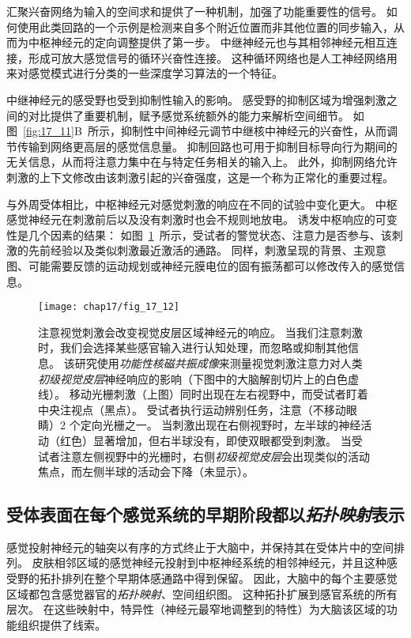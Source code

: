 汇聚兴奋网络为输入的空间求和提供了一种机制，加强了功能重要性的信号。
如何使用此类回路的一个示例是检测来自多个附近位置而非其他位置的同步输入，从而为中枢神经元的定向调整提供了第一步。 
中继神经元也与其相邻神经元相互连接，形成可放大感觉信号的循环兴奋性连接。 
这种循环网络也是人工神经网络用来对感觉模式进行分类的一些深度学习算法的一个特征。


中继神经元的感受野也受到抑制性输入的影响。 
感受野的抑制区域为增强刺激之间的对比提供了重要机制，赋予感觉系统额外的能力来解析空间细节。 
如图~\ref{fig:17_11}B~所示，抑制性中间神经元调节中继核中神经元的兴奋性，从而调节传输到网络更高层的感觉信息量。
抑制回路也可用于抑制目标导向行为期间的无关信息，从而将注意力集中在与特定任务相关的输入上。 
此外，抑制网络允许刺激的上下文修改由该刺激引起的兴奋强度，这是一个称为正常化的重要过程。


与外周受体相比，中枢神经元对感觉刺激的响应在不同的试验中变化更大。 
中枢感觉神经元在刺激前后以及没有刺激时也会不规则地放电。 
诱发中枢响应的可变性是几个因素的结果：
如图~\ref{fig:17_12}~所示，受试者的警觉状态、注意力是否参与、该刺激的先前经验以及类似刺激最近激活的通路。
同样，刺激呈现的背景、主观意图、可能需要反馈的运动规划或神经元膜电位的固有振荡都可以修改传入的感觉信息。


\begin{figure}[htbp]
	\centering
	\texttt{[image: chap17/fig\_17\_12]}
	\caption{注意视觉刺激会改变视觉皮层区域神经元的响应。
		当我们注意刺激时，我们会选择某些感官输入进行认知处理，而忽略或抑制其他信息。
		该研究使用\textit{功能性核磁共振成像}来测量视觉刺激注意力对人类\textit{初级视觉皮层}神经响应的影响（下图中的大脑解剖切片上的白色虚线）。
		移动光栅刺激（上图）同时出现在左右视野中，而受试者盯着中央注视点（黑点）。
		受试者执行运动辨别任务，注意（不移动眼睛）2 个定向光栅之一。
		当刺激出现在右侧视野时，左半球的神经活动（红色）显著增加，但右半球没有，即使双眼都受到刺激。 
		当受试者注意左侧视野中的光栅时，右侧\textit{初级视觉皮层}会出现类似的活动焦点，而左侧半球的活动会下降（未显示）\cite{gandhi1999spatial}。}
	\label{fig:17_12}
\end{figure}


\subsection{受体表面在每个感觉系统的早期阶段都以\textit{拓扑映射}表示}

感觉投射神经元的轴突以有序的方式终止于大脑中，并保持其在受体片中的空间排列。 
皮肤相邻区域的感觉神经元投射到中枢神经系统的相邻神经元，并且这种感受野的拓扑排列在整个早期体感通路中得到保留。 
因此，大脑中的每个主要感觉区域都包含感觉器官的\textit{拓扑映射}、空间组织图。
这种拓扑扩展到感官系统的所有层次。
在这些映射中，特异性（神经元最窄地调整到的特性）为大脑该区域的功能组织提供了线索。


